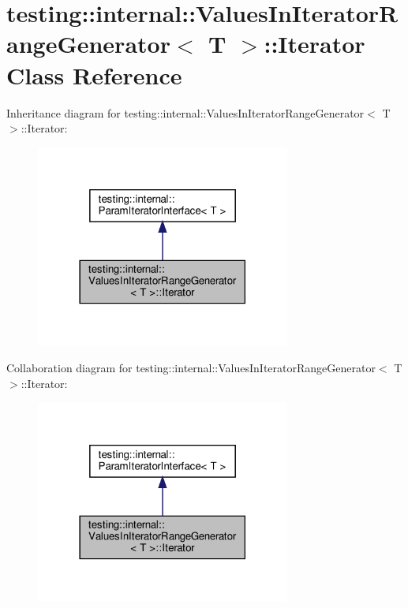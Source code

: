 \hypertarget{classtesting_1_1internal_1_1ValuesInIteratorRangeGenerator_1_1Iterator}{}\section{testing\+:\+:internal\+:\+:Values\+In\+Iterator\+Range\+Generator$<$ T $>$\+:\+:Iterator Class Reference}
\label{classtesting_1_1internal_1_1ValuesInIteratorRangeGenerator_1_1Iterator}


Inheritance diagram for testing\+:\+:internal\+:\+:Values\+In\+Iterator\+Range\+Generator$<$ T $>$\+:\+:Iterator\+:\nopagebreak
\begin{figure}[H]
\begin{center}
\leavevmode
\includegraphics[width=237pt]{classtesting_1_1internal_1_1ValuesInIteratorRangeGenerator_1_1Iterator__inherit__graph}
\end{center}
\end{figure}


Collaboration diagram for testing\+:\+:internal\+:\+:Values\+In\+Iterator\+Range\+Generator$<$ T $>$\+:\+:Iterator\+:\nopagebreak
\begin{figure}[H]
\begin{center}
\leavevmode
\includegraphics[width=237pt]{classtesting_1_1internal_1_1ValuesInIteratorRangeGenerator_1_1Iterator__coll__graph}
\end{center}
\end{figure}
